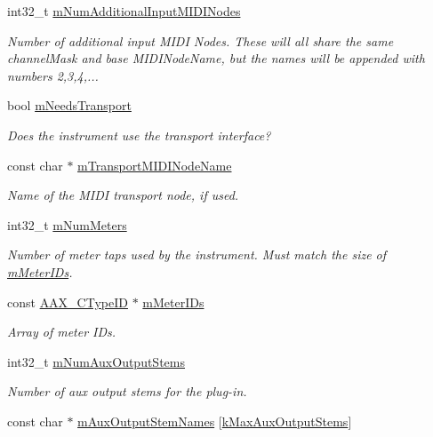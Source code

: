 \begin{DoxyCompactItemize}
int32\+\_\+t \mbox{\hyperlink{a01957_a256b7a612ed6ff827d47d8ea5b7c0968}{m\+Num\+Additional\+Input\+M\+I\+D\+I\+Nodes}}
\begin{DoxyCompactList}\small\item\em Number of additional input M\+I\+DI Nodes. These will all share the same channel\+Mask and base M\+I\+D\+I\+Node\+Name, but the names will be appended with numbers 2,3,4,... \end{DoxyCompactList}\item 
bool \mbox{\hyperlink{a01957_af76fbb79466b45d7f48153e7951e843a}{m\+Needs\+Transport}}
\begin{DoxyCompactList}\small\item\em Does the instrument use the transport interface? \end{DoxyCompactList}\item 
const char $\ast$ \mbox{\hyperlink{a01957_a8e96dc4ba78132184cfff16720e72bde}{m\+Transport\+M\+I\+D\+I\+Node\+Name}}
\begin{DoxyCompactList}\small\item\em Name of the M\+I\+DI transport node, if used. \end{DoxyCompactList}\item 
int32\+\_\+t \mbox{\hyperlink{a01957_a58815894e89a352e5013046cbfa2a834}{m\+Num\+Meters}}
\begin{DoxyCompactList}\small\item\em Number of meter taps used by the instrument. Must match the size of \mbox{\hyperlink{a01957_a996dacfece0048579de34e08cb10b449}{m\+Meter\+I\+Ds}}. \end{DoxyCompactList}\item 
const \mbox{\hyperlink{a00392_ac678f9c1fbcc26315d209f71a147a175}{A\+A\+X\+\_\+\+C\+Type\+ID}} $\ast$ \mbox{\hyperlink{a01957_a996dacfece0048579de34e08cb10b449}{m\+Meter\+I\+Ds}}
\begin{DoxyCompactList}\small\item\em Array of meter I\+Ds. \end{DoxyCompactList}\item 
int32\+\_\+t \mbox{\hyperlink{a01957_ac969f7d3a23a8bb66d53c8e6d8360dca}{m\+Num\+Aux\+Output\+Stems}}
\begin{DoxyCompactList}\small\item\em Number of aux output stems for the plug-\/in. \end{DoxyCompactList}\item 
const char $\ast$ \mbox{\hyperlink{a01957_a407f17bca3271cc84f0b85eefb0370cd}{m\+Aux\+Output\+Stem\+Names}} \mbox{[}\mbox{\hyperlink{a00746_a3ce9db1fba97512379a8715f9cb166e4}{k\+Max\+Aux\+Output\+Stems}}\mbox{]}

\end{DoxyCompactItemize}
